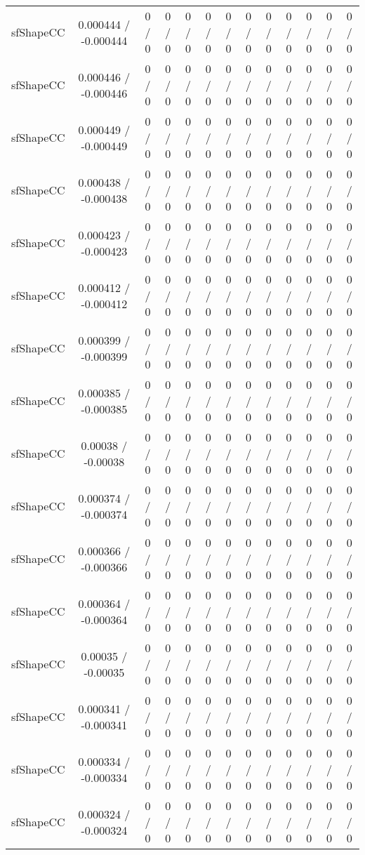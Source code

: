\documentclass[10pt]{article}
\begin{document}
\begin{table}[htbp]
\begin{center}
\begin{tabular}{|c|c|c|c|c|c|c|c|c|c|c|c|c|}
  sfShapeCC & 0.000444 / -0.000444 & 0 / 0 & 0 / 0 & 0 / 0 & 0 / 0 & 0 / 0 & 0 / 0 & 0 / 0 & 0 / 0 & 0 / 0 & 0 / 0 & 0 / 0 \\ 
  sfShapeCC & 0.000446 / -0.000446 & 0 / 0 & 0 / 0 & 0 / 0 & 0 / 0 & 0 / 0 & 0 / 0 & 0 / 0 & 0 / 0 & 0 / 0 & 0 / 0 & 0 / 0 \\ 
  sfShapeCC & 0.000449 / -0.000449 & 0 / 0 & 0 / 0 & 0 / 0 & 0 / 0 & 0 / 0 & 0 / 0 & 0 / 0 & 0 / 0 & 0 / 0 & 0 / 0 & 0 / 0 \\ 
  sfShapeCC & 0.000438 / -0.000438 & 0 / 0 & 0 / 0 & 0 / 0 & 0 / 0 & 0 / 0 & 0 / 0 & 0 / 0 & 0 / 0 & 0 / 0 & 0 / 0 & 0 / 0 \\ 
  sfShapeCC & 0.000423 / -0.000423 & 0 / 0 & 0 / 0 & 0 / 0 & 0 / 0 & 0 / 0 & 0 / 0 & 0 / 0 & 0 / 0 & 0 / 0 & 0 / 0 & 0 / 0 \\ 
  sfShapeCC & 0.000412 / -0.000412 & 0 / 0 & 0 / 0 & 0 / 0 & 0 / 0 & 0 / 0 & 0 / 0 & 0 / 0 & 0 / 0 & 0 / 0 & 0 / 0 & 0 / 0 \\ 
  sfShapeCC & 0.000399 / -0.000399 & 0 / 0 & 0 / 0 & 0 / 0 & 0 / 0 & 0 / 0 & 0 / 0 & 0 / 0 & 0 / 0 & 0 / 0 & 0 / 0 & 0 / 0 \\ 
  sfShapeCC & 0.000385 / -0.000385 & 0 / 0 & 0 / 0 & 0 / 0 & 0 / 0 & 0 / 0 & 0 / 0 & 0 / 0 & 0 / 0 & 0 / 0 & 0 / 0 & 0 / 0 \\ 
  sfShapeCC & 0.00038 / -0.00038 & 0 / 0 & 0 / 0 & 0 / 0 & 0 / 0 & 0 / 0 & 0 / 0 & 0 / 0 & 0 / 0 & 0 / 0 & 0 / 0 & 0 / 0 \\ 
  sfShapeCC & 0.000374 / -0.000374 & 0 / 0 & 0 / 0 & 0 / 0 & 0 / 0 & 0 / 0 & 0 / 0 & 0 / 0 & 0 / 0 & 0 / 0 & 0 / 0 & 0 / 0 \\ 
  sfShapeCC & 0.000366 / -0.000366 & 0 / 0 & 0 / 0 & 0 / 0 & 0 / 0 & 0 / 0 & 0 / 0 & 0 / 0 & 0 / 0 & 0 / 0 & 0 / 0 & 0 / 0 \\ 
  sfShapeCC & 0.000364 / -0.000364 & 0 / 0 & 0 / 0 & 0 / 0 & 0 / 0 & 0 / 0 & 0 / 0 & 0 / 0 & 0 / 0 & 0 / 0 & 0 / 0 & 0 / 0 \\ 
  sfShapeCC & 0.00035 / -0.00035 & 0 / 0 & 0 / 0 & 0 / 0 & 0 / 0 & 0 / 0 & 0 / 0 & 0 / 0 & 0 / 0 & 0 / 0 & 0 / 0 & 0 / 0 \\ 
  sfShapeCC & 0.000341 / -0.000341 & 0 / 0 & 0 / 0 & 0 / 0 & 0 / 0 & 0 / 0 & 0 / 0 & 0 / 0 & 0 / 0 & 0 / 0 & 0 / 0 & 0 / 0 \\ 
  sfShapeCC & 0.000334 / -0.000334 & 0 / 0 & 0 / 0 & 0 / 0 & 0 / 0 & 0 / 0 & 0 / 0 & 0 / 0 & 0 / 0 & 0 / 0 & 0 / 0 & 0 / 0 \\ 
  sfShapeCC & 0.000324 / -0.000324 & 0 / 0 & 0 / 0 & 0 / 0 & 0 / 0 & 0 / 0 & 0 / 0 & 0 / 0 & 0 / 0 & 0 / 0 & 0 / 0 & 0 / 0 \\ 

\end{tabular}
\end{center}
\end{table}
\end{document}
